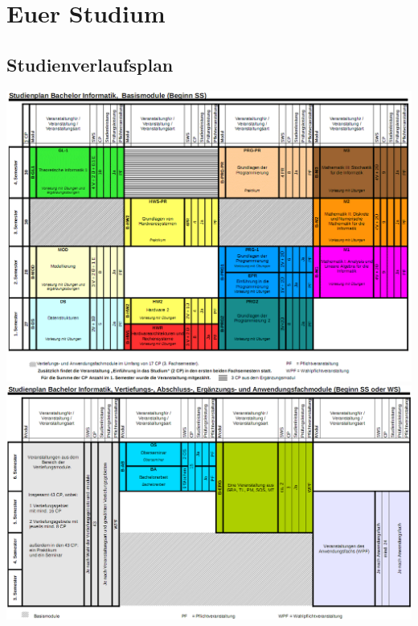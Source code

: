 \documentclass[12pt,a4paper]{scrartcl}
\begin{document}
\section{Euer Studium}
%
\subsection{Studienverlaufsplan}
\includegraphics[width=18cm]{bilder/basismodulebachelorSS}
\newline
\includegraphics[width=18cm]{bilder/sonstigemodulebachelor}
\newpage
\end{document}

